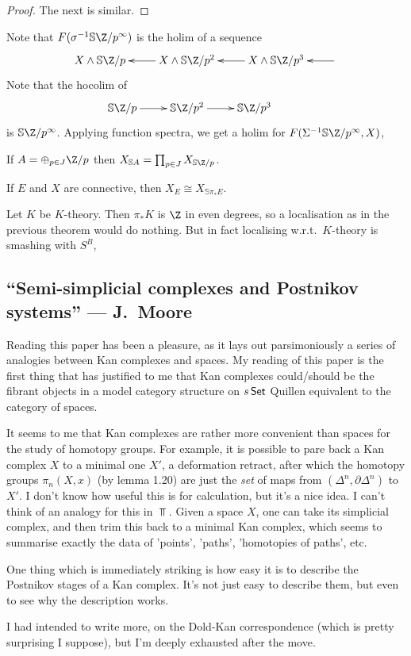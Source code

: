 \documentclass[11pt]{article}
\newcommand{\KanSemResponse}[1]
{
\thispagestyle{fancy}
\section{#1}
}
\begin{document}
\begin{MarkusLocalisation}
\begin{enumerate}
\begin{proof}
The next is similar.
\end{proof}
Note that $F(\sigma^{-1}\mathbb{S}\Z/p^\infty)$ is the holim of a sequence
\[\xymatrix{
X\sprod \mathbb{S}\Z/p&\ar[l]X\sprod \mathbb{S}\Z/p^2&\ar[l]X\sprod \mathbb{S}\Z/p^3&\ar[l]
}\]
Note that the hocolim of 
\[\xymatrix{
 \mathbb{S}\Z/p&\ar[l];[] \mathbb{S}\Z/p^2&\ar[l];[] \mathbb{S}\Z/p^3&
}\]
is $\mathbb{S}\Z/p^\infty$.
Applying function spectra, we get a holim for $F(\Sigma^{-1}\mathbb{S}\Z/p^\infty,X)$,
\end{enumerate}
\begin{thm*}
If $A=\oplus_{p\in J}\Z/p$ then $X_{\mathbb{S}A}=\prod_{p\in J}X_{\mathbb{S}\Z/p}$.
\end{thm*}
\begin{thm*}
If $E$ and $X$ are connective, then $X_E\cong X_{\mathbb{S}\pi_*E}$.
\end{thm*}
\begin{defn*}
Let $K$ be $K$-theory. Then $\pi_*K$ is $\Z$ in even degrees, so a localisation as in the previous theorem would do nothing. But in fact localising w.r.t.\ $K$-theory is smashing with $S^B$, 
\end{defn*}


\pagebreak
\end{MarkusLocalisation}
\begin{MoorePostnikovSystems}
\KanSemResponse
{``Semi-simplicial complexes and Postnikov systems'' --- J.\ Moore}
Reading this paper has been a pleasure, as it lays out parsimoniously a series of analogies between Kan complexes and spaces. My reading of this paper is the first thing that has justified to me that Kan complexes could/should be the fibrant objects in a model category structure on $s\operatorname{{\mathsf{Set}}}$ Quillen equivalent to the category of spaces.

It seems to me that Kan complexes are rather more convenient than spaces for the study of homotopy groups. For example, it is possible to pare back a Kan complex $X$ to a minimal one $X'$, a deformation retract, after which the homotopy groups $\pi_n(X,x)$ (by lemma 1.20) are just the \emph{set} of maps from $(\Delta^n,\partial\Delta^n)$ to $X'$. I don't know how useful this is for calculation, but it's a nice idea. I can't think of an analogy for this in $\Top$. Given a space $X$, one can take its simplicial complex, and then trim this back to a minimal Kan complex, which seems to summarise exactly the data of 'points', 'paths', 'homotopies of paths', etc.

One thing which is immediately striking is how easy it is to describe the Postnikov stages of a Kan complex. It's not just easy to describe them, but even to see why the description works.

I had intended to write more, on the Dold-Kan correspondence (which is pretty surprising I suppose), but I'm deeply exhausted after the move.
\pagebreak
\end{MoorePostnikovSystems}
\end{document}
